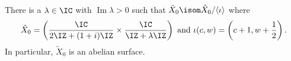 \begin{cor}\label{cor: pullback to product central fibre at 0}
There is a $\lambda\in\IC$ with $\operatorname{Im}\lambda>0$ such that
$ \tilde X_0\isom \hat X_0 /\langle\iota\rangle$ where 
\[
 \hat  X_0=
 \left(
 \frac{\IC}{2\IZ+(1+i)\IZ}
 \times
 \frac{\IC}{\IZ+\lambda\IZ}
 \right) \text { and }
 \iota(c,w)=\left(c+1,w+\frac12\right).
\]
In particular, $\tilde X_0$ is an abelian surface.
\end{cor}